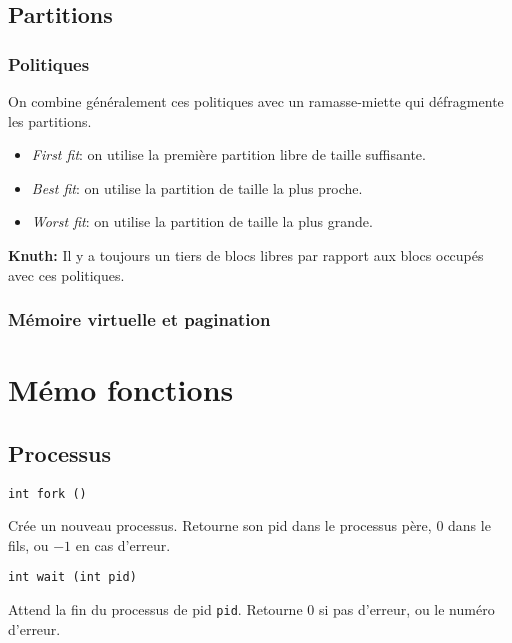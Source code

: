 \documentclass[a4paper]{article}
\begin{document}
\begin{multicols*}{2}
    \subsection{Partitions}
    
    \subsubsection{Politiques}

    On combine généralement ces politiques avec un ramasse-miette qui défragmente les partitions.

    \begin{itemize}
        \item \emph{First fit}: on utilise la première partition libre de taille suffisante.
        \item \emph{Best fit}: on utilise la partition de taille la plus proche.
        \item \emph{Worst fit}: on utilise la partition de taille la plus grande.
    \end{itemize}

    \textbf{Knuth:} Il y a toujours un tiers de blocs libres par rapport aux blocs occupés avec ces politiques.

    \subsubsection{Mémoire virtuelle et pagination}

    


    \section{Mémo fonctions}

    \subsection{Processus}

    \begin{lstlisting}
int fork ()
    \end{lstlisting}

    Cr\'ee un nouveau processus.
    Retourne son pid dans le processus p\`ere, $0$ dans le fils, ou $-1$ en cas d'erreur.

    \begin{lstlisting}
int wait (int pid)
    \end{lstlisting}

    Attend la fin du processus de pid \texttt{pid}.
    Retourne 0 si pas d'erreur, ou le num\'ero d'erreur.


\end{multicols*}
\end{document}
